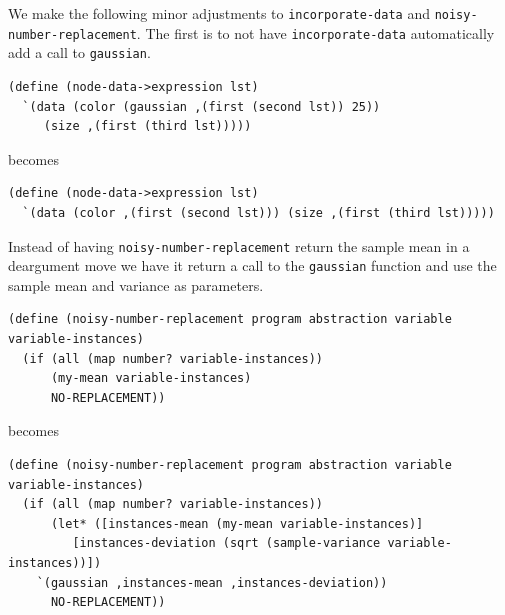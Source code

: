 \documentclass[a4paper,10pt]{article}
\begin{document}
We make the following minor adjustments to \texttt{incorporate-data} and \texttt{noisy-number-replacement}. The first is to not have \texttt{incorporate-data} automatically add a call to \texttt{gaussian}.
\begin{lstlisting}[frame=trblsingle]
(define (node-data->expression lst)
  `(data (color (gaussian ,(first (second lst)) 25))
	 (size ,(first (third lst)))))
\end{lstlisting}
becomes
\begin{lstlisting}[frame=trblsingle]
(define (node-data->expression lst)
  `(data (color ,(first (second lst))) (size ,(first (third lst)))))
\end{lstlisting}
Instead of having \texttt{noisy-number-replacement} return the sample mean in a deargument move we have it return a call to the \texttt{gaussian} function and use the sample mean and variance as parameters.
\begin{lstlisting}[frame=trbl]
(define (noisy-number-replacement program abstraction variable variable-instances)
  (if (all (map number? variable-instances))
      (my-mean variable-instances)
      NO-REPLACEMENT))
\end{lstlisting}
becomes
\begin{lstlisting}[frame=trblsingle]
(define (noisy-number-replacement program abstraction variable variable-instances)
  (if (all (map number? variable-instances))
      (let* ([instances-mean (my-mean variable-instances)]
	     [instances-deviation (sqrt (sample-variance variable-instances))])
	`(gaussian ,instances-mean ,instances-deviation))
      NO-REPLACEMENT))
\end{lstlisting}
\end{document}
